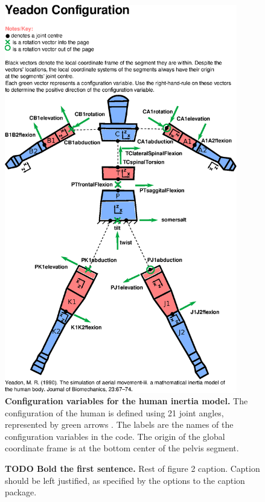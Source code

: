 \documentclass[10pt]{article}
\begin{document}
\begin{figure}[!ht]
\begin{center}
\includegraphics[width=4in]{configuration.eps}
\end{center}
\caption{
{\bf Configuration variables for the human inertia model.}  The configuration of
the human is defined using 21 joint angles, represented by green arrows
\cite{Yeadon1990e}. The labels are the names of the configuration variables in
the code. The origin of the global coordinate frame is at the bottom center of
the pelvis segment.
}
\label{fig:config}
\end{figure}

\begin{figure}[!ht]
\begin{center}
\end{center}
\caption{
{\bf TODO Bold the first sentence.}  Rest of figure 2  caption.  Caption 
should be left justified, as specified by the options to the caption 
package.
}
\label{fig:femaledefault}
\end{figure}
\end{document}
